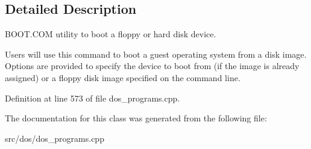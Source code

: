 \subsection{Detailed Description}
B\-O\-O\-T.\-C\-O\-M utility to boot a floppy or hard disk device. 

Users will use this command to boot a guest operating system from a disk image. Options are provided to specify the device to boot from (if the image is already assigned) or a floppy disk image specified on the command line. 

Definition at line 573 of file dos\-\_\-programs.\-cpp.



The documentation for this class was generated from the following file\-:\begin{DoxyCompactItemize}
\item 
src/dos/dos\-\_\-programs.\-cpp\end{DoxyCompactItemize}
